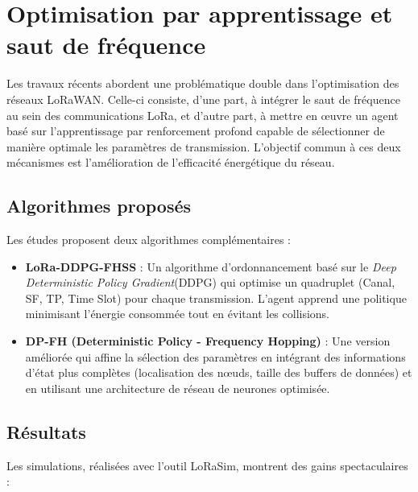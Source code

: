\section{Optimisation par apprentissage et saut de fréquence}

Les travaux récents abordent une problématique double dans l'optimisation des réseaux LoRaWAN. Celle-ci consiste, d'une part, à intégrer le saut de fréquence au sein des communications LoRa, et d'autre part, à mettre en œuvre un agent basé sur l'apprentissage par renforcement profond capable de sélectionner de manière optimale les paramètres de transmission. L'objectif commun à ces deux mécanismes est l'amélioration de l'efficacité énergétique du réseau.

\subsection{Algorithmes proposés}

Les études \cite{greenlora,greenlora2024} proposent deux algorithmes complémentaires :

\begin{itemize}
	\item \textbf{LoRa-DDPG-FHSS} \cite{greenlora} : Un algorithme d'ordonnancement basé sur le \textit{Deep Deterministic Policy Gradient}(DDPG) qui optimise un quadruplet (Canal, SF, TP, Time Slot) pour chaque transmission. L'agent apprend une politique minimisant l'énergie consommée tout en évitant les collisions.
	
	\item \textbf{DP-FH (Deterministic Policy - Frequency Hopping)} \cite{greenlora2024} : Une version améliorée qui affine la sélection des paramètres en intégrant des informations d'état plus complètes (localisation des nœuds, taille des buffers de données) et en utilisant une architecture de réseau de neurones optimisée.
\end{itemize}

\subsection{Résultats}

Les simulations, réalisées avec l'outil LoRaSim, montrent des gains spectaculaires :


